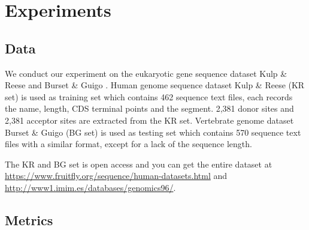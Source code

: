 \documentclass[journal,twoside]{IEEEtran}
\begin{document}
\section{Experiments}\label{3}

\subsection{Data}\label{3.1}

We conduct our experiment on the eukaryotic gene sequence dataset Kulp \& Reese \cite{reese1997improved} and Burset \& Guigo \cite{burset1996evaluation}. Human genome sequence dataset Kulp \& Reese (KR set) is used as training set which contains 462 sequence text files, each records the name, length, CDS terminal points and the segment. 2,381 donor sites and 2,381 acceptor sites are extracted from the KR set. Vertebrate genome dataset Burset \& Guigo (BG set) is used as testing set which contains 570 sequence text files with a similar format, except for a lack of the sequence length. 

The KR and BG set is open access and you can get the entire dataset at \url{https://www.fruitfly.org/sequence/human-datasets.html} and \url{http://www1.imim.es/databases/genomics96/}. 

\subsection{Metrics}\label{3.2}
\end{document}
